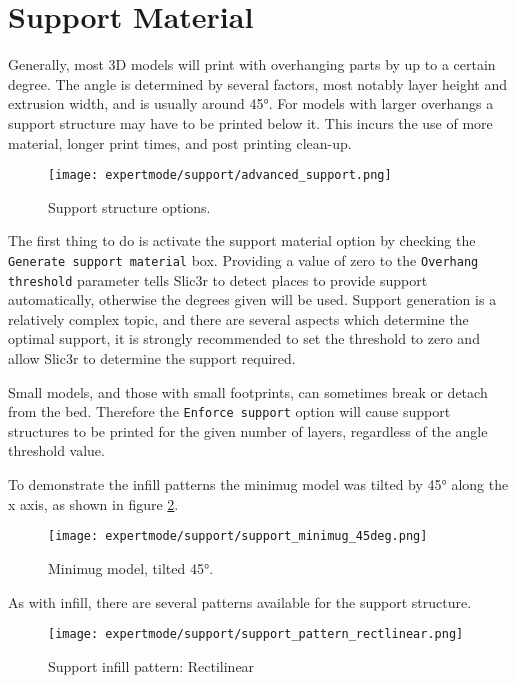 \section{Support Material} %
\label{sec:support}

Generally, most 3D models will print with overhanging parts by up to a certain degree.  The angle is determined by several factors, most notably layer height and extrusion width, and is usually around 45°.  For models with larger overhangs a support structure may have to be printed below it.  This incurs the use of more material, longer print times, and post printing clean-up.


\begin{figure}[H]
\centering
\texttt{[image: expertmode/support/advanced\_support.png]}
\caption{Support structure options.}
\label{fig:advanced_support}
\end{figure}

The first thing to do is activate the support material option by checking the \texttt{Generate support material} box.  Providing a value of zero to the \texttt{Overhang threshold} parameter tells Slic3r to detect places to provide support automatically, otherwise the degrees given will be used.  Support generation is a relatively complex topic, and there are several aspects which determine the optimal support, it is strongly recommended to set the threshold to zero and allow Slic3r to determine the support required.

Small models, and those with small footprints, can sometimes break or detach from the bed.  Therefore the \texttt{Enforce support} option will cause support structures to be printed for the given number of layers, regardless of the angle threshold value.

To demonstrate the infill patterns the minimug model was tilted by 45° along the x axis, as shown in figure \ref{fig:support_minimug_45deg}.

\begin{figure}[H]
\centering
\texttt{[image: expertmode/support/support\_minimug\_45deg.png]}
\caption{Minimug model, tilted 45°.}
\label{fig:support_minimug_45deg}
\end{figure}

As with infill, there are several patterns available for the support structure.

\begin{figure}[H]
\centering
\texttt{[image: expertmode/support/support\_pattern\_rectlinear.png]}
\caption{Support infill pattern: Rectilinear}
\label{fig:support_pattern_rectlinear}
\end{figure}

